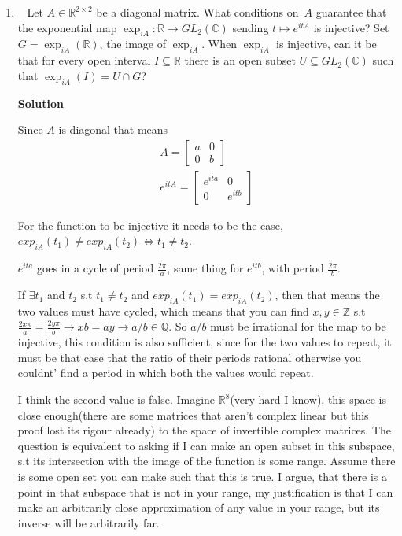 \documentclass[11pt]{article}
\newcommand\score[1]{\marginpar{\vspace{-2ex}\color{blue}{#1/14}}\hspace{-1ex}}
\newcommand\0{\mathbf{0}}
\newcommand\CC{\mathbb{C}}
\newcommand\RR{\mathbb{R}}
\newcommand\ZZ{\mathbb{Z}}
\newcommand\GL{\mathit{GL}}
\newcommand\<{\langle}
\renewcommand\>{\rangle}
\begin{document}
\begin{enumerate}
We extend the proof to any basis(basis-free) by noting that $\bigwedge \varphi$ is a linear function, therefore the 
trace doesn't change since it is a property of the linear transformatiom, not its representation. So the trace is the same in any basis,
therefore this fact works independent of the basis you working in.

\item\ \score{}%
Let $A \in \RR^{2 \times 2}$ be a diagonal matrix.  What conditions
on~$A$ guarantee that the exponential map $\exp_{iA}: \RR \to
\GL_2(\CC)$ sending $t \mapsto e^{itA}$ is injective?  Set $G =
\exp_{iA}(\RR)$, the image of $\exp_{iA}$.  When $\exp_{iA}$ is
injective, can it be that for every open interval $I \subseteq \RR$
there is an open subset $U \subseteq \GL_2(\CC)$ such that
$\exp_{iA}(I) = U \cap G$?

\textbf{Solution}

Since $A$ is diagonal that means
\begin{align*}
	A=\begin{bmatrix}
		a & 0\\
		0 & b
	\end{bmatrix}\\
	e^{itA}=\begin{bmatrix}
		e^{ita} & 0\\         	
		0 & e^{itb}
	\end{bmatrix}
\end{align*}

For the function to be injective it needs to be the case,
$exp_{iA}(t_{1}) \neq exp_{iA}(t_{2}) \Longleftrightarrow t_{1}\neq t_{2}$. 

$e^{ita}$ goes in a cycle of period $\frac{2\pi}{a}$, same thing for $e^{itb}$, with period $\frac{2\pi}{b}$.

If $\exists t_{1}$ and $t_{2}$ s.t $t_{1} \neq t_{2}$ and $exp_{iA}(t_{1})=exp_{iA}(t_{2})$, then that means the 
two values must have cycled, which means that you can find $x,y\in \ZZ$ s.t $\frac{2x\pi}{a}=\frac{2y\pi}{b} \rightarrow xb=ay\rightarrow a/b\in \mathbb{Q}$.
So $a/b$ must be irrational for the map to be injective, this condition is also sufficient, since for the two values to repeat, it must be 
that case that the ratio of their periods rational otherwise you couldnt' find a period in which both the values would repeat.

I think the second value is false. Imagine $\RR^8$(very hard I know), this space is close enough(there are some matrices that aren't complex linear but this proof lost its rigour already) to the space of 
invertible complex matrices. The question is equivalent to asking if I can make an open subset in this subspace,
s.t its intersection with the image of the function is some range. Assume there is some open set you can make such that this is true. I argue, 
that there is a point in that subspace that is not in your range, my justification is that I can make an arbitrarily close approximation of any value in your range,
but its inverse will be arbitrarily far.


\end{enumerate}
\end{document}

